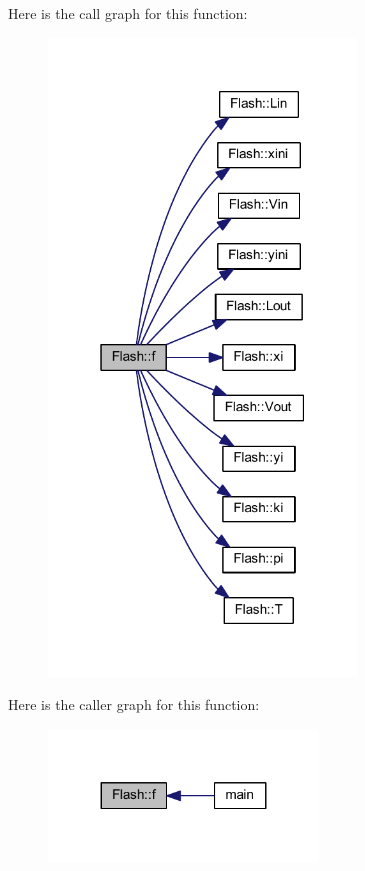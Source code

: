 Here is the call graph for this function\+:
\nopagebreak
\begin{figure}[H]
\begin{center}
\leavevmode
\includegraphics[width=232pt]{class_flash_ad29e755877ca96aa5b9f34a10d6cd8b2_cgraph}
\end{center}
\end{figure}
Here is the caller graph for this function\+:
\nopagebreak
\begin{figure}[H]
\begin{center}
\leavevmode
\includegraphics[width=203pt]{class_flash_ad29e755877ca96aa5b9f34a10d6cd8b2_icgraph}
\end{center}
\end{figure}
\mbox{\label{class_flash_a5ae7d29d13281fafa84cc9c247461fda}} 
